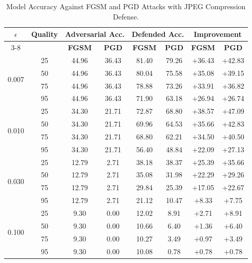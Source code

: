 \documentclass[../main.tex]{subfiles}
\begin{document}
\begin{table}[H]
    \centering
    \caption{Model Accuracy Against FGSM and PGD Attacks with JPEG Compression Defense.}
    \label{tab:jpeg_defense_merged}
    \begin{tabular}{cc|cc|cc|cc}
    \toprule
    \multirow{2}{*}{\textbf{$\epsilon$}} & \multirow{2}{*}{\textbf{Quality}} & \multicolumn{2}{c|}{\textbf{Adversarial Acc.}} & \multicolumn{2}{c|}{\textbf{Defended Acc.}} & \multicolumn{2}{c}{\textbf{Improvement}} \\
    \cmidrule{3-8}
    & & \textbf{FGSM} & \textbf{PGD} & \textbf{FGSM} & \textbf{PGD} & \textbf{FGSM} & \textbf{PGD} \\
    \midrule
    \multirow{4}{*}{0.007} & 25 & 44.96 & 36.43 & 81.40 & 79.26 & +36.43 & +42.83 \\
    & 50 & 44.96 & 36.43 & 80.04 & 75.58 & +35.08 & +39.15 \\
    & 75 & 44.96 & 36.43 & 78.88 & 73.26 & +33.91 & +36.82 \\
    & 95 & 44.96 & 36.43 & 71.90 & 63.18 & +26.94 & +26.74 \\
    \midrule
    \multirow{4}{*}{0.010} & 25 & 34.30 & 21.71 & 72.87 & 68.80 & +38.57 & +47.09 \\
    & 50 & 34.30 & 21.71 & 69.96 & 64.53 & +35.66 & +42.83 \\
    & 75 & 34.30 & 21.71 & 68.80 & 62.21 & +34.50 & +40.50 \\
    & 95 & 34.30 & 21.71 & 56.40 & 48.84 & +22.09 & +27.13 \\
    \midrule
    \multirow{4}{*}{0.030} & 25 & 12.79 & 2.71 & 38.18 & 38.37 & +25.39 & +35.66 \\
    & 50 & 12.79 & 2.71 & 35.08 & 31.98 & +22.29 & +29.26 \\
    & 75 & 12.79 & 2.71 & 29.84 & 25.39 & +17.05 & +22.67 \\
    & 95 & 12.79 & 2.71 & 21.12 & 10.47 & +8.33 & +7.75 \\
    \midrule
    \multirow{4}{*}{0.100} & 25 & 9.30 & 0.00 & 12.02 & 8.91 & +2.71 & +8.91 \\
    & 50 & 9.30 & 0.00 & 10.66 & 6.40 & +1.36 & +6.40 \\
    & 75 & 9.30 & 0.00 & 10.27 & 3.49 & +0.97 & +3.49 \\
    & 95 & 9.30 & 0.00 & 10.08 & 0.78 & +0.78 & +0.78 \\
    \bottomrule
    \end{tabular}
    
\end{table}
\end{document}

